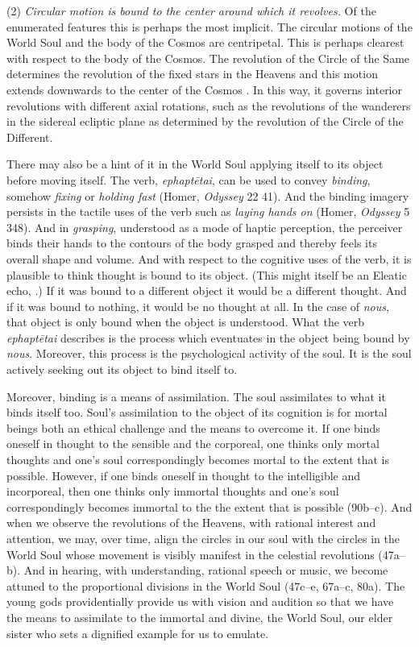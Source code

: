 (2) \emph{Circular motion is bound to the center around which it revolves.} Of the enumerated features this is perhaps the most implicit. The circular motions of the World Soul and the body of the Cosmos are centripetal. This is perhaps clearest with respect to the body of the Cosmos. The revolution of the Circle of the Same determines the revolution of the fixed stars in the Heavens and this motion extends downwards to the center of the Cosmos \citep[32]{Vlastos:1975aa}. In this way, it governs interior revolutions with different axial rotations, such as the revolutions of the wanderers in the sidereal ecliptic plane as determined by the revolution of the Circle of the Different.

There may also be a hint of it in the World Soul applying itself to its object before moving itself. The verb, \emph{ephaptētai}, can be used to convey \emph{binding}, somehow \emph{fixing} or \emph{holding fast} (Homer, \emph{Odyssey} 22 41). And the binding imagery persists in the tactile uses of the verb such as \emph{laying hands on} (Homer, \emph{Odyssey} 5 348). And in \emph{grasping}, understood as a mode of haptic perception, the perceiver binds their hands to the contours of the body grasped and thereby feels its overall shape and volume. And with respect to the cognitive uses of the verb, it is plausible to think thought is bound to its object. (This might itself be an Eleatic echo, \citealt[192]{Mourelatos:2008ve}.) If it was bound to a different object it would be a different thought. And if it was bound to nothing, it would be no thought at all. In the case of \emph{nous}, that object is only bound when the object is understood. What the verb \emph{ephaptētai} describes is the process which eventuates in the object being bound by \emph{nous}. Moreover, this process is the psychological activity of the soul. It is the soul actively seeking out its object to bind itself to. 

Moreover, binding is a means of assimilation. The soul assimilates to what it binds itself too. Soul's assimilation to the object of its cognition is for mortal beings both an ethical challenge and the means to overcome it. If one binds oneself in thought to the sensible and the corporeal, one thinks only mortal thoughts and one's soul correspondingly becomes mortal to the extent that is possible. However, if one binds oneself in thought to the intelligible and incorporeal, then one thinks only immortal thoughts and one's soul correspondingly becomes immortal to the the extent that is possible (90b--c). And when we observe the revolutions of the Heavens, with rational interest and attention, we may, over time, align the circles in our soul with the circles in the World Soul whose movement is visibly manifest in the celestial revolutions (47a--b). And in hearing, with understanding, rational speech or music, we become attuned to the proportional divisions in the World Soul (47c--e, 67a--c, 80a). The young gods providentially provide us with vision and audition so that we have the means to assimilate to the immortal and divine, the World Soul, our elder sister who sets a dignified example for us to emulate.

